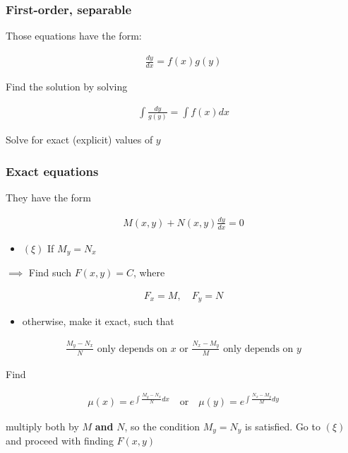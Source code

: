 \documentclass[12pt]{article}
\begin{document}
\subsubsection*{First-order, separable}
\label{sec:org472ee4b}
Those equations have the form:

\begin{align*}
	\frac{dy}{dx} = f(x)g(y)
\end{align*}

Find the solution by solving

\begin{align*}
	\int \frac{dy}{g(y)} = \int f(x) dx
\end{align*}


Solve for exact (explicit) values of \(y\)

\subsubsection*{Exact equations}
\label{sec:org71db26e}
They have the form

\begin{align*}
	M(x,y) + N(x,y) \frac{dy}{dx} = 0
\end{align*}

\begin{itemize}
\item \((\xi)\) If \(M_y = N_x\)
\end{itemize}

\(\implies\) Find such \(F(x,y)=C\), where

\begin{align*}
	F_x = M, \quad F_y = N
\end{align*}

\begin{itemize}
\item otherwise, make it exact, such that
\end{itemize}

\begin{align*}
\frac{M_y-N_x}{N} \text{ only depends on } x \text{ or } \frac{N_x-M_y}{M} \text{ only depends on } y
\end{align*}

Find

\begin{align*}
	\mu(x) = e^{\int \frac{M_y-N_x}{N} dx} \quad\text{or}\quad \mu(y) = e^{\int \frac{N_x-M_y}{M} dy}
\end{align*}

multiply both by \(M\) \textbf{and} \(N\),
so the condition \(M_y = N_y\) is satisfied. Go to \((\xi)\) and proceed with
finding \(F(x,y)\)
\end{document}
